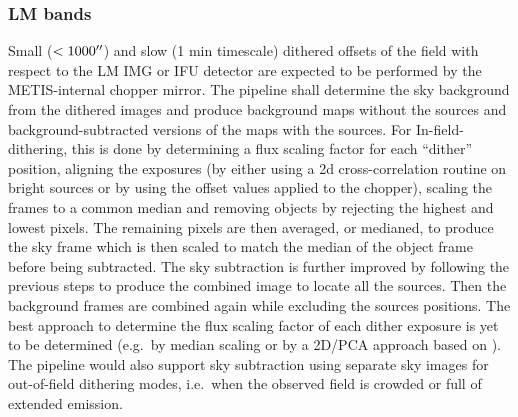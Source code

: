 
\subsubsection{LM bands}
Small ($< 1000 \hbox{$^{\prime\prime}$}$) and slow (1 min timescale) dithered offsets of the field with respect to the LM IMG or \ac{IFU} detector are expected to be performed by the METIS-internal chopper mirror.
The pipeline shall determine the sky background from the dithered images and produce background maps without the sources and background-subtracted versions of the maps with the sources.
For In-field-dithering, this is done by determining a flux scaling factor for each ``dither'' position, aligning the exposures (by either using a 2d cross-correlation routine on bright sources or by using the offset values applied to the chopper), scaling the frames to a common median and removing objects by rejecting the highest and lowest pixels.
The remaining pixels are then averaged, or medianed, to produce the sky frame which is then scaled to match the median of the object frame before being subtracted.
The sky subtraction is further improved by following the previous steps to produce the combined image to locate all the sources.
Then the background frames are combined again while excluding the sources positions.
The best approach to determine the flux scaling factor of each dither exposure is yet to be determined (e.g.\ by median scaling or by a 2D/PCA approach based on \cite{Hunziker2018}).
The pipeline would also support sky subtraction using separate sky images for out-of-field dithering modes, i.e.\ when the observed field is crowded or full of extended emission.

